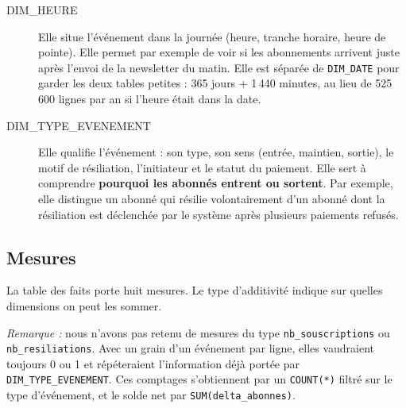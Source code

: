 \documentclass[a4paper,12pt]{article}
\begin{document}
\begin{description}
  \item[DIM\_HEURE] Elle situe l'événement dans la journée (heure, tranche
  horaire, heure de pointe). Elle permet par exemple de voir si les
  abonnements arrivent juste après l'envoi de la newsletter du matin.
  Elle est séparée de \texttt{DIM\_DATE} pour garder les deux tables petites :
  365 jours + 1\,440 minutes, au lieu de 525\,600 lignes par an si l'heure
  était dans la date.

  \item[DIM\_TYPE\_EVENEMENT] Elle qualifie l'événement : son type, son sens
  (entrée, maintien, sortie), le motif de résiliation, l'initiateur et le
  statut du paiement. Elle sert à comprendre \textbf{pourquoi les abonnés
  entrent ou sortent}. Par exemple, elle distingue un abonné qui résilie
  volontairement d'un abonné dont la résiliation est déclenchée par le
  système après plusieurs paiements refusés.

\end{description}

\subsection{Mesures}

La table des faits porte huit mesures. Le type d'additivité indique sur
quelles dimensions on peut les sommer.

\medskip

\noindent\textit{Remarque :} nous n'avons pas retenu de mesures du type
\texttt{nb\_souscriptions} ou \texttt{nb\_resiliations}. Avec un grain d'un
événement par ligne, elles vaudraient toujours 0 ou 1 et répéteraient
l'information déjà portée par \texttt{DIM\_TYPE\_EVENEMENT}. Ces comptages
s'obtiennent par un \texttt{COUNT(*)} filtré sur le type d'événement, et le
solde net par \texttt{SUM(delta\_abonnes)}.
\end{document}
